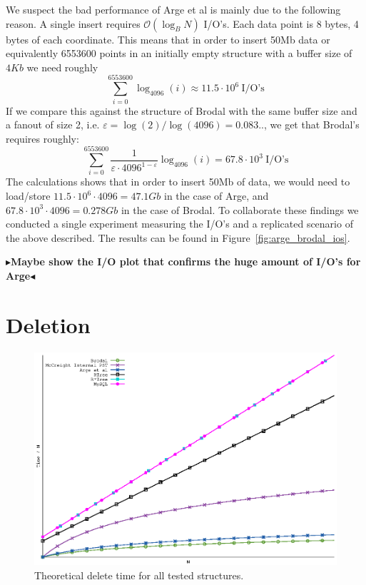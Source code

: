 \documentclass[twoside,11pt,openright]{report}
\def \epsilon {\varepsilon}
\newcommand{\todo}[1]{{\color[rgb]{.5,0,0}\textbf{$\blacktriangleright$#1$\blacktriangleleft$}}}
\begin{document}
We suspect the bad performance of Arge et al is mainly due to the following reason. A single insert requires $\mathcal{O}(\log_B N)$ I/O's. Each data point is 8 bytes, 4 bytes of each coordinate. This means that in order to insert 50Mb data or equivalently 6553600 points in an initially empty structure with a buffer size of $4Kb$ we need roughly $$\sum\limits_{i=0}^{6553600} \log_{4096}(i) \approx 11.5 \cdot 10^6~\text{I/O's}$$
If we compare this against the structure of Brodal with the same buffer size and a fanout of size 2, i.e. $\epsilon = \log(2)/\log(4096) = 0.083..$, we get that Brodal's requires roughly:
$$\sum\limits_{i=0}^{6553600} \frac{1}{\epsilon \cdot 4096^{1-\epsilon}} \log_{4096}(i) = 67.8\cdot 10^3~\text{I/O's}$$
The calculations shows that in order to insert 50Mb of data, we would need to load/store $11.5 \cdot 10^6 \cdot 4096 = 47.1Gb$ in the case of Arge, and $67.8\cdot 10^3 \cdot 4096 = 0.278Gb$ in the case of Brodal.
To collaborate these findings we conducted a single experiment measuring the I/O's and a replicated scenario of the above described. The results can be found in Figure~\ref{fig:arge_brodal_ios}.


\todo{Maybe show the I/O plot that confirms the huge amount of I/O's for Arge}

\section{Deletion}
\begin{figure}[htp!]
\includegraphics[width=\textwidth]{../plots/delete_complexities/delete_complexity}
\caption{Theoretical delete time for all tested structures.}
\label{fig:theory_delete_complexity}
\end{figure}
\end{document}
